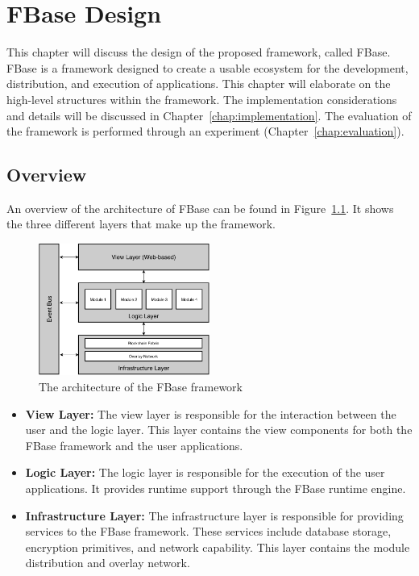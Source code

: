 \chapter{\label{chap:design}FBase Design}

This chapter will discuss the design of the proposed framework, called FBase. FBase is a framework designed to create a usable ecosystem for the development, distribution, and execution of applications. This chapter will elaborate on the high-level structures within the framework. The implementation considerations and details will be discussed in Chapter~\ref{chap:implementation}. The evaluation of the framework is performed through an experiment (Chapter~\ref{chap:evaluation}).

\section{Overview}

An overview of the architecture of FBase can be found in Figure~\ref{fig:architecture}. It shows the three different layers that make up the framework.

\begin{figure}[h]
	\centering
	\includegraphics[width=0.5\textwidth]{images/design-architecture.pdf}
	\caption{\label{fig:architecture} The architecture of the FBase framework}
\end{figure}

\begin{itemize}
	\item \textbf{View Layer:}
	The view layer is responsible for the interaction between the user and the logic layer. This layer contains the view components for both the FBase framework and the user applications.
	
	\item \textbf{Logic Layer:} The logic layer is responsible for the execution of the user applications. It provides runtime support through the FBase runtime engine.
	
	\item \textbf{Infrastructure Layer:} The infrastructure layer is responsible for providing services to the FBase framework. These services include database storage, encryption primitives, and network capability. This layer contains the module distribution and overlay network.
\end{itemize}

